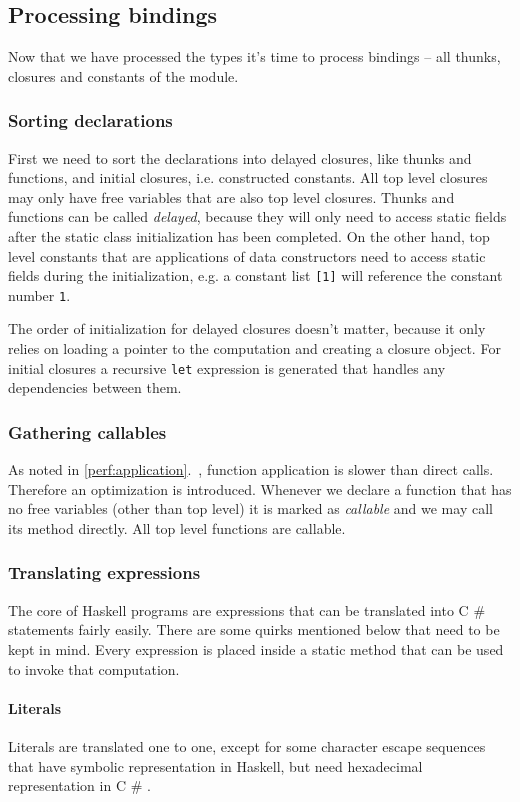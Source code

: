 \documentclass[en]{pracamgr}
\newcommand{\shrp}{%
  {\fontfamily{ppl}\selectfont\#%
  }}
\newcommand{\myref}[1]{\ref{#1}.~\textit{\nameref{#1}}}
\begin{document}
\subsection{Processing bindings}
Now that we have processed the types it's time to process bindings
-- all thunks, closures and constants of the module.

\subsubsection{Sorting declarations}
First we need to sort the declarations into delayed closures,
like thunks and functions, and initial closures, i.e. constructed constants.
All top level closures may only have free variables that are also top level
closures. Thunks and functions can be called \textit{delayed}, because they
will only need to access static fields after the static class initialization has
been completed. On the other hand, top level constants that are applications
of data constructors need to access static fields during the initialization,
e.g. a constant list \texttt{[1]} will reference the constant number \texttt{1}.

The order of initialization for delayed closures doesn't matter, because
it only relies on loading a pointer to the computation and creating a closure object.
For initial closures a recursive \texttt{let} expression is generated that handles
any dependencies between them.

\subsubsection{Gathering callables}
As noted in \myref{perf:application}, function application is slower than
direct calls. Therefore an optimization is introduced. Whenever we declare
a function that has no free variables (other than top level) it is marked
as \textit{callable} and we may call its method directly. All top level
functions are callable.

\subsubsection{Translating expressions}
The core of Haskell programs are expressions that can be translated into
C\shrp{} statements fairly easily. There are some quirks mentioned below
that need to be kept in mind. Every expression is placed inside a
static method that can be used to invoke that computation.

\paragraph{Literals}
Literals are translated one to one, except for some character escape sequences
that have symbolic representation in Haskell, but need hexadecimal representation
in C\shrp{}.
\end{document}
